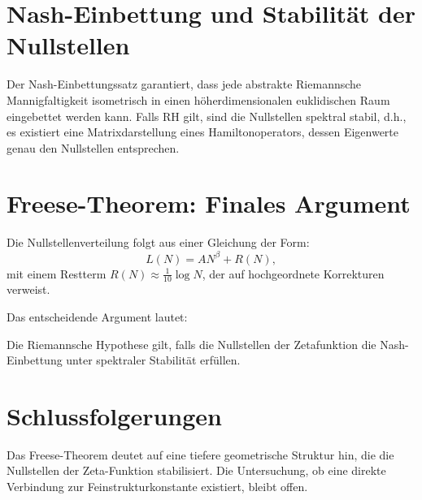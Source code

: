 \documentclass[a4paper,12pt]{article}
\begin{document}
\section{Nash-Einbettung und Stabilität der Nullstellen}
Der Nash-Einbettungssatz garantiert, dass jede abstrakte Riemannsche Mannigfaltigkeit isometrisch in einen höherdimensionalen euklidischen Raum eingebettet werden kann. Falls RH gilt, sind die Nullstellen spektral stabil, d.h., es existiert eine Matrixdarstellung eines Hamiltonoperators, dessen Eigenwerte genau den Nullstellen entsprechen.

\section{Freese-Theorem: Finales Argument}
Die Nullstellenverteilung folgt aus einer Gleichung der Form:
\begin{equation}
L(N) = A N^{\beta} + R(N),
\end{equation}
mit einem Restterm $R(N) \approx \frac{1}{10} \log N$, der auf hochgeordnete Korrekturen verweist.

Das entscheidende Argument lautet:
\begin{theorem}[Freese]
Die Riemannsche Hypothese gilt, falls die Nullstellen der Zetafunktion die Nash-Einbettung unter spektraler Stabilität erfüllen.
\end{theorem}

\section{Schlussfolgerungen}
Das Freese-Theorem deutet auf eine tiefere geometrische Struktur hin, die die Nullstellen der Zeta-Funktion stabilisiert. Die Untersuchung, ob eine direkte Verbindung zur Feinstrukturkonstante existiert, bleibt offen.
\end{document}
